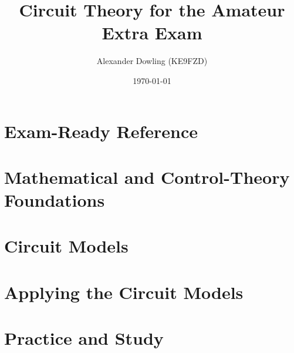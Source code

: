 \documentclass[11pt,letterpaper,oneside,openany]{book}
\title{Circuit Theory for the Amateur Extra Exam}
\author{Alexander Dowling (KE9FZD)}
\date{\today}
\begin{document}
\frontmatter
{}

\cleardoublepage
{}



\tableofcontents

\mainmatter
\part{Exam-Ready Reference}


\part{Mathematical and Control-Theory Foundations}






\part{Circuit Models}









\part{Applying the Circuit Models}










\part{Practice and Study}




\appendix




\backmatter
\nocite{ncvec_extra_2024,ncvec_general_2023,hamexam,arrl_extra_12,
        extra_pool_2020,romanchik_extra_2016,shellhamer_extra_2017,
        leigh2012control,white2004highfrequency,weber2001microwave,
        gheorghe2017simulation,egan2003practical,carr2002measurement,
        bowick2008rfcircuit,carr2002components,free2022rfmicrowave,
        eroglu2013rfcircuit,nguyen2015rfic,davis2011rfcircuit,carr2001secrets,
        vankka2005synthesizers,giannini2008baseband,logvinov2022receivers}


\end{document}
